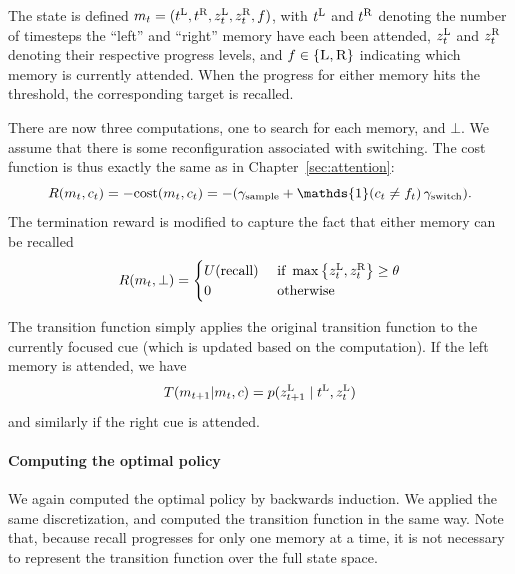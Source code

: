 The state is defined $m_t = (t^{\text{L}}, t^{\text{R}}, z_t^{\text{L}}, z_t^{\text{R}}, f)$, with $t^{\text{L}}$ and $t^{\text{R}}$ denoting the number of timesteps the ``left'' and ``right'' memory have each been attended, $z_t^{\text{L}}$ and $z_t^{\text{R}}$ denoting their respective progress levels, and $f \in \{\textsc{L}, \textsc{R}\}$ indicating which memory is currently attended. When the progress for either memory hits the threshold, the corresponding target is recalled.

There are now three computations, one to search for each memory, and $\bot$. We assume that there is some reconfiguration associated with switching. The cost function is thus exactly the same as in Chapter~\ref{sec:attention}:
\begin{equation}
R(m_t, c_t) = -\cost(m_t, c_t) = -(\samplecost + \mathds{1}(c_t \neq \last_t)\,\switchcost).
\end{equation}
The termination reward is modified to capture the fact that either memory can be recalled
%
\begin{equation}\label{eq:reward2}
  R(m_t, \bot) = \begin{cases} 
    U({\text{recall}}) & \text{ if } \max\left\{z_t^{\text{L}}, z_t^{\text{R}}\right\} \geq \theta \\
    0 & \text{ otherwise }
  \end{cases}
\end{equation}

The transition function simply applies the original transition function to the currently focused cue (which is updated based on the computation). If the left memory is attended, we have
%
\begin{equation}\label{eq:mem-transition2}
  T(m_{t+1} | m_t, c) = p(z_{t+1}^{\text{L}} \mid t^{\text{L}}, z_t^{\text{L}})
\end{equation}
and similarly if the right cue is attended.


\paragraph{Computing the optimal policy}

We again computed the optimal policy by backwards induction. We applied the same discretization, and computed the transition function in the same way. Note that, because recall progresses for only one memory at a time, it is not necessary to represent the transition function over the full state space.

